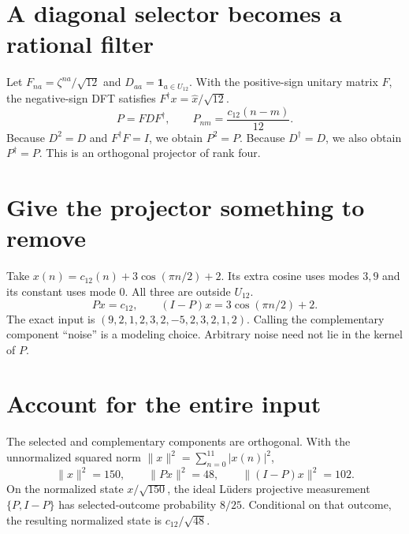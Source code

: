 \clearpage\section*{A diagonal selector becomes a rational filter}
Let $F_{na}=\zeta^{na}/\sqrt{12}$ and $D_{aa}=\mathbf1_{a\in U_{12}}$. With the positive-sign unitary matrix $F$, the negative-sign DFT satisfies $F^\dagger x=\widehat x/\sqrt{12}$.
\[
 P=FDF^\dagger,\qquad P_{nm}=\frac{c_{12}(n-m)}{12}.
\]
Because $D^2=D$ and $F^\dagger F=I$, we obtain $P^2=P$. Because $D^\dagger=D$, we also obtain $P^\dagger=P$. This is an orthogonal projector of rank four.

\clearpage\section*{Give the projector something to remove}
Take $x(n)=c_{12}(n)+3\cos(\pi n/2)+2$. Its extra cosine uses modes $3,9$ and its constant uses mode $0$. All three are outside $U_{12}$.
\[
 Px=c_{12},\qquad (I-P)x=3\cos(\pi n/2)+2.
\]
The exact input is $(9,2,1,2,3,2,-5,2,3,2,1,2)$. Calling the complementary component ``noise'' is a modeling choice. Arbitrary noise need not lie in the kernel of $P$.

\clearpage\section*{Account for the entire input}
The selected and complementary components are orthogonal. With the unnormalized squared norm $\|x\|^2=\sum_{n=0}^{11}|x(n)|^2$,
\[
 \|x\|^2=150,\qquad\|Px\|^2=48,\qquad\|(I-P)x\|^2=102.
\]
On the normalized state $x/\sqrt{150}$, the ideal L\"uders projective measurement $\{P,I-P\}$ has selected-outcome probability $8/25$. Conditional on that outcome, the resulting normalized state is $c_{12}/\sqrt{48}$.

